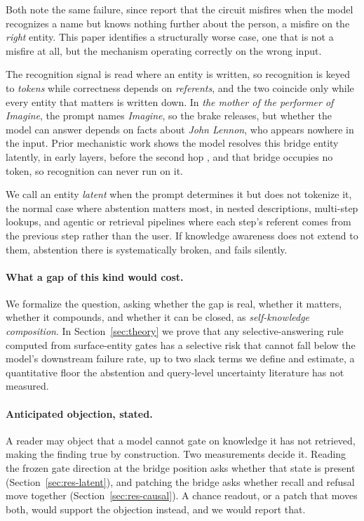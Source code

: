 \documentclass{article}
\begin{document}
Both note the same failure, since \citet{lindsey2025biology} report that the circuit misfires when
the model recognizes a name but knows nothing further about the person, a misfire on the
\emph{right} entity. This paper identifies a structurally worse case, one that is not a misfire at
all, but the mechanism operating correctly on the wrong input.

The recognition signal is read where an entity is written, so recognition is keyed to \emph{tokens}
while correctness depends on \emph{referents}, and the two coincide only while every entity that
matters is written down. In \emph{the mother of the performer of Imagine}, the prompt names
\emph{Imagine}, so the brake releases, but whether the model can answer depends on facts about
\emph{John Lennon}, who appears nowhere in the input. Prior mechanistic work shows the model resolves
this bridge entity latently, in early layers, before the second hop
\citep{yang2024latent,biran2024hopping}, and that bridge occupies no token, so recognition can never
run on it.

We call an entity \emph{latent} when the prompt determines it but does not tokenize it, the normal
case where abstention matters most, in nested descriptions, multi-step lookups, and agentic or
retrieval pipelines where each step's referent comes from the previous step rather than the user. If
knowledge awareness does not extend to them, abstention there is systematically broken, and fails
silently.

\paragraph{What a gap of this kind would cost.} We formalize the question, asking whether the gap is
real, whether it matters, whether it compounds, and whether it can be closed, as \emph{self-knowledge
composition}. In Section~\ref{sec:theory} we prove that any selective-answering rule computed from
surface-entity gates has a selective risk that cannot fall below the model's downstream failure rate,
up to two slack terms we define and estimate, a quantitative floor the abstention and query-level
uncertainty literature \citep{gottesman2024estimating,kossen2024semantic,chen2026querylevel} has not
measured.

\paragraph{Anticipated objection, stated.} A reader may object that a model cannot gate on knowledge
it has not retrieved, making the finding true by construction. Two measurements decide it. Reading
the frozen gate direction at the bridge position asks whether that state is present
(Section~\ref{sec:res-latent}), and patching the bridge asks whether recall and refusal move together
(Section~\ref{sec:res-causal}). A chance readout, or a patch that moves both, would support the
objection instead, and we would report that.
\end{document}
